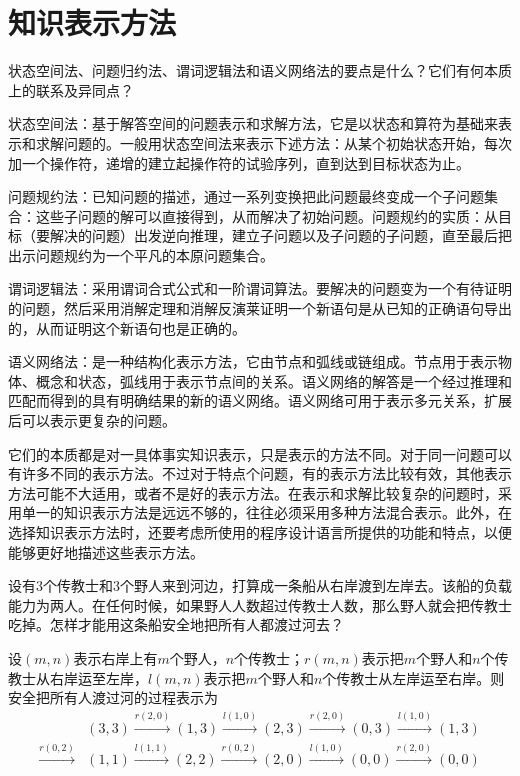 \chapter{知识表示方法}

\begin{question}
状态空间法、问题归约法、谓词逻辑法和语义网络法的要点是什么？它们有何本质上的联系及异同点？
\end{question}	
\begin{solution}
状态空间法：基于解答空间的问题表示和求解方法，它是以状态和算符为基础来表示和求解问题的。一般用状态空间法来表示下述方法：从某个初始状态开始，每次加一个操作符，递增的建立起操作符的试验序列，直到达到目标状态为止。 \par
问题规约法：已知问题的描述，通过一系列变换把此问题最终变成一个子问题集合：这些子问题的解可以直接得到，从而解决了初始问题。问题规约的实质：从目标（要解决的问题）出发逆向推理，建立子问题以及子问题的子问题，直至最后把出示问题规约为一个平凡的本原问题集合。 \par
谓词逻辑法：采用谓词合式公式和一阶谓词算法。要解决的问题变为一个有待证明的问题，然后采用消解定理和消解反演莱证明一个新语句是从已知的正确语句导出的，从而证明这个新语句也是正确的。\par
语义网络法：是一种结构化表示方法，它由节点和弧线或链组成。节点用于表示物体、概念和状态，弧线用于表示节点间的关系。语义网络的解答是一个经过推理和匹配而得到的具有明确结果的新的语义网络。语义网络可用于表示多元关系，扩展后可以表示更复杂的问题。\par
它们的本质都是对一具体事实知识表示，只是表示的方法不同。对于同一问题可以有许多不同的表示方法。不过对于特点个问题，有的表示方法比较有效，其他表示方法可能不大适用，或者不是好的表示方法。在表示和求解比较复杂的问题时，采用单一的知识表示方法是远远不够的，往往必须采用多种方法混合表示。此外，在选择知识表示方法时，还要考虑所使用的程序设计语言所提供的功能和特点，以便能够更好地描述这些表示方法。
\end{solution}

\begin{question}
设有$3$个传教士和$3$个野人来到河边，打算成一条船从右岸渡到左岸去。该船的负载能力为两人。在任何时候，如果野人人数超过传教士人数，那么野人就会把传教士吃掉。怎样才能用这条船安全地把所有人都渡过河去？
\end{question}
\begin{solution}
设$(m,n)$表示右岸上有$m$个野人，$n$个传教士；$r(m,n)$表示把$m$个野人和$n$个传教士从右岸运至左岸，$l(m,n)$表示把$m$个野人和$n$个传教士从左岸运至右岸。则安全把所有人渡过河的过程表示为
\begin{align*}
& (3,3) \xrightarrow{r(2,0)} (1,3) \xrightarrow{l(1,0)} (2,3) 
	\xrightarrow{r(2,0)} (0,3) \xrightarrow{l(1,0)} (1,3) \\
	\xrightarrow{r(0,2)} & (1,1) \xrightarrow{l(1,1)} (2,2) 
	\xrightarrow{r(0,2)} (2,0) \xrightarrow{l(1,0)} (0,0) \xrightarrow{r(2,0)} (0,0)
\end{align*}
\end{solution}

